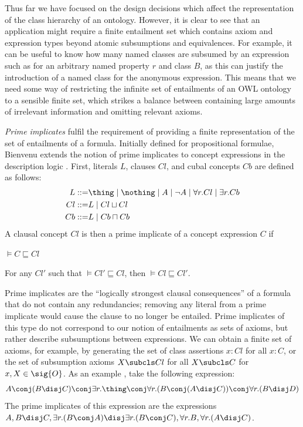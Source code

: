 Thus far we have focused on the design decisions which affect the representation of the class hierarchy of an ontology. However, it is clear to see that an application might require a finite entailment set which contains axiom and expression types beyond atomic subsumptions and equivalences. For example, it can be useful to know how many named classes are subsumed by an expression such as  for an arbitrary named property $r$ and class $B$, as this can justify the introduction of a named class for the anonymous expression. This means that we need some way of restricting the infinite set of entailments of an OWL ontology to a sensible finite set, which strikes a balance between containing large amounts of irrelevant information and omitting relevant axioms.

\emph{Prime implicates} \cite{quine52aa,quine59aa,jackson92aa,bienvenu09aa} fulfil the requirement of providing a finite representation of the set of entailments of a formula. Initially defined for propositional formulae, Bienvenu \cite{bienvenu07aa} extends the notion of prime implicates to concept expressions in the description logic . First, literals $L$, clauses $Cl$, and cubal concepts $Cb$ are defined as follows:
\begin{align*}
L ::=  &\thing \mid \nothing \mid A \mid \neg A \mid \forall r.Cl \mid \exists r.Cb \\
Cl ::= & L \mid Cl \sqcup Cl \\
Cb ::= & L \mid Cb \sqcap Cb
\end{align*}
A clausal concept $Cl$ is then a prime implicate of a concept expression $C$ if 
\begin{compactenum}
\item $\models C \sqsubseteq Cl$
\item For any $Cl'$ such that $\models Cl' \sqsubseteq Cl$, then $\models Cl \sqsubseteq Cl'$.
\end{compactenum}

Prime implicates are the \enquote{logically strongest clausal consequences} \cite{bienvenu09aa} of a formula that do not contain any redundancies; removing any literal from a prime implicate would cause the clause to no longer be entailed. Prime implicates of this type do not correspond to our notion of entailments as sets of axioms, but rather describe subsumptions between expressions. We can obtain a finite set of axioms, for example, by generating the set of class assertions $x:Cl$ for all $x:C$, or the set of subsumption axioms $X \subcls Cl$ for all $X \subcls C$ for $x, X \in \sig{O}$. As an example \cite{bienvenu07aa}, take the following expression:
\begin{align*}
A \conj (B \disj C) \conj \exists r.\thing \conj \forall r.(B \conj (A \disj C)) \conj \forall r.(B \disj D)
\end{align*}
The prime implicates of this expression are the expressions $A, B \disj C, \exists r.(B \conj A) \disj \exists r.(B \conj C), \forall r.B, \forall r.(A \disj C)$.

